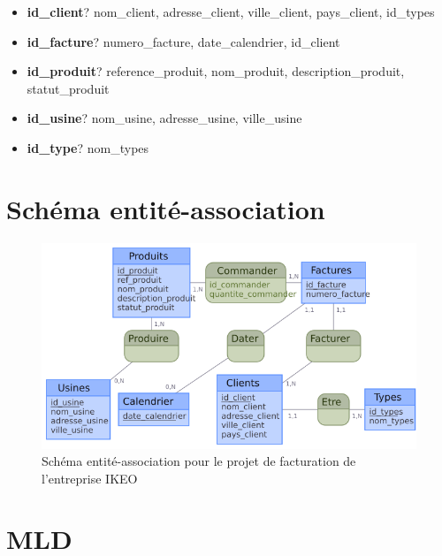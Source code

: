 \documentclass[french]{article}
\begin{document}
\begin{itemize}
    \item \textbf{id\_client}? nom\_client, adresse\_client, ville\_client, pays\_client, id\_types
    \item \textbf{id\_facture}? numero\_facture, date\_calendrier, id\_client
    \item \textbf{id\_produit}? reference\_produit, nom\_produit, description\_produit, statut\_produit
    \item \textbf{id\_usine}? nom\_usine, adresse\_usine, ville\_usine
    \item \textbf{id\_type}? nom\_types
\end{itemize}

\section{Schéma entité-association}

\begin{figure}[!htbp]
    \centering
    \includegraphics[width=\textwidth]{Rapport/Image/schema_EA.png}
    \caption{Schéma entité-association pour le projet de facturation de l'entreprise IKEO}
    \label{fig:schema_bdd}
\end{figure}
    
\section{MLD}
\end{document}
